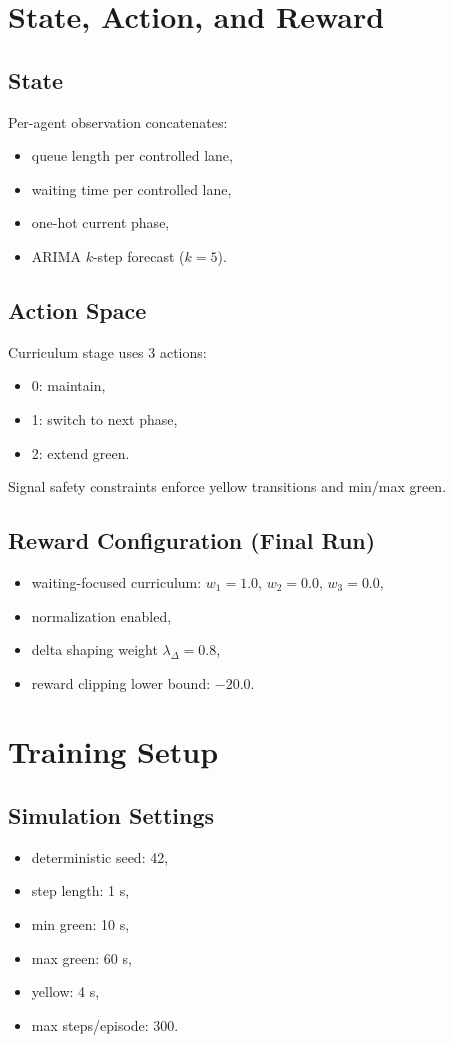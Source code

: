 \documentclass[conference]{IEEEtran}
\begin{document}
\section{State, Action, and Reward}
\subsection{State}
Per-agent observation concatenates:
\begin{itemize}
    \item queue length per controlled lane,
    \item waiting time per controlled lane,
    \item one-hot current phase,
    \item ARIMA $k$-step forecast ($k=5$).
\end{itemize}

\subsection{Action Space}
Curriculum stage uses 3 actions:
\begin{itemize}
    \item 0: maintain,
    \item 1: switch to next phase,
    \item 2: extend green.
\end{itemize}
Signal safety constraints enforce yellow transitions and min/max green.

\subsection{Reward Configuration (Final Run)}
\begin{itemize}
    \item waiting-focused curriculum: $w_1=1.0$, $w_2=0.0$, $w_3=0.0$,
    \item normalization enabled,
    \item delta shaping weight $\lambda_\Delta=0.8$,
    \item reward clipping lower bound: $-20.0$.
\end{itemize}

\section{Training Setup}
\subsection{Simulation Settings}
\begin{itemize}
    \item deterministic seed: 42,
    \item step length: 1 s,
    \item min green: 10 s,
    \item max green: 60 s,
    \item yellow: 4 s,
    \item max steps/episode: 300.
\end{itemize}
\end{document}
